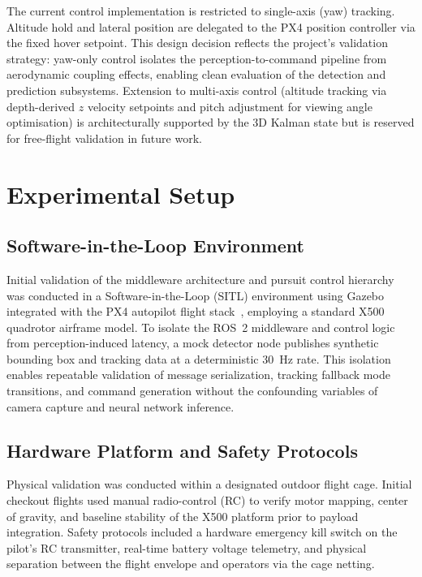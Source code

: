 \documentclass[11pt,letterpaper]{article}
\begin{document}
The current control implementation is restricted to single-axis (yaw)
tracking.  Altitude hold and lateral position are delegated to the PX4
position controller via the fixed hover setpoint.  This design decision
reflects the project's validation strategy: yaw-only control isolates
the perception-to-command pipeline from aerodynamic coupling effects,
enabling clean evaluation of the detection and prediction subsystems.
Extension to multi-axis control (altitude tracking via depth-derived
$z$ velocity setpoints and pitch adjustment for viewing angle
optimisation) is architecturally supported by the 3D Kalman state
but is reserved for free-flight validation in future work.

\section{Experimental Setup}
\label{sec:experiments}

\subsection{Software-in-the-Loop Environment}

Initial validation of the middleware architecture and pursuit control
hierarchy was conducted in a Software-in-the-Loop (SITL) environment
using Gazebo~\cite{gazebo2004} integrated with the PX4 autopilot
flight stack~\cite{px4docs}, employing a standard X500 quadrotor
airframe model.  To isolate the ROS~2 middleware and control logic from
perception-induced latency, a mock detector node publishes synthetic
bounding box and tracking data at a deterministic 30~Hz rate.  This
isolation enables repeatable validation of message serialization,
tracking fallback mode transitions, and command generation without the
confounding variables of camera capture and neural network inference.

\subsection{Hardware Platform and Safety Protocols}

Physical validation was conducted within a designated outdoor flight
cage.  Initial checkout flights used manual radio-control (RC) to
verify motor mapping, center of gravity, and baseline stability of the
X500 platform prior to payload integration.  Safety protocols included
a hardware emergency kill switch on the pilot's RC transmitter,
real-time battery voltage telemetry, and physical separation between
the flight envelope and operators via the cage netting.
\end{document}
